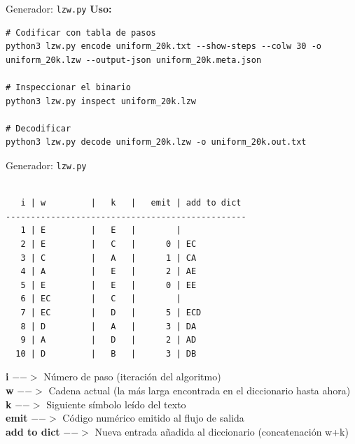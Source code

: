 \documentclass{beamer}
\theoremstyle{plain}
\theoremstyle{example}
\theoremstyle{example}
\begin{document}
\begin{frame}[fragile] {Generador: \texttt{lzw.py}}
\textbf{Uso:}
\begin{lstlisting}
# Codificar con tabla de pasos
python3 lzw.py encode uniform_20k.txt --show-steps --colw 30 -o uniform_20k.lzw --output-json uniform_20k.meta.json

# Inspeccionar el binario
python3 lzw.py inspect uniform_20k.lzw

# Decodificar
python3 lzw.py decode uniform_20k.lzw -o uniform_20k.out.txt
\end{lstlisting}


\end{frame}


\begin{frame}[fragile] {Generador: \texttt{lzw.py}}
\footnotesize
\begin{verbatim}

   i | w         |   k   |   emit | add to dict                   
------------------------------------------------
   1 | E         |   E   |        |                               
   2 | E         |   C   |      0 | EC                            
   3 | C         |   A   |      1 | CA                            
   4 | A         |   E   |      2 | AE                            
   5 | E         |   E   |      0 | EE                            
   6 | EC        |   C   |        |                               
   7 | EC        |   D   |      5 | ECD                           
   8 | D         |   A   |      3 | DA                            
   9 | A         |   D   |      2 | AD                            
  10 | D         |   B   |      3 | DB            

\end{verbatim}
\footnotesize
\textbf{i}	$-->$ Número de paso (iteración del algoritmo)\\
\textbf{w}	$-->$ Cadena actual (la más larga encontrada en el diccionario hasta ahora)\\
\textbf{k}	$-->$ Siguiente símbolo leído del texto\\
\textbf{emit} $-->$	Código numérico emitido al flujo de salida\\
\textbf{add to dict}	 $-->$ Nueva entrada añadida al diccionario (concatenación w+k)\\

\end{frame}
\end{document}
